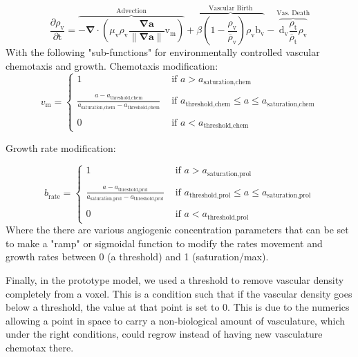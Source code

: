 \documentclass[10point]{article}
\newcommand{\beq}{\begin{equation}}
\newcommand{\eeq}{\end{equation}}
\renewcommand{\vec}[1]{\mathbf{#1}}
\begin{document}
\beq
     \frac{\partial \rho_{\textrm{v}}}{\partial {\textrm{t}}} = \overbrace{ - \vec{\nabla} \cdot \left( \mu_{\textrm{v}} \rho_{\textrm{v}} \frac{\vec{\nabla a}}{\parallel \vec{\nabla a} \parallel} \textrm{v}_{\textrm{m}} \right)}^{ \textrm{Advection} } + \overbrace{\beta (1 - \frac{\rho_{\textrm{v}}}{\overline{\rho}_{\textrm{v}}}) \rho_{\textrm{v}} \textrm{b}_\textrm{v}}^{ \textrm{Vascular Birth}} -\overbrace{\textrm{d}_{\textrm{v}} \frac{\rho_{\textrm{t}}}{\overline{\rho}_{\textrm{t}}} \rho_{\textrm{v}}}^{ \textrm {Vas. Death}}
\eeq
\newline
With the following "sub-functions" for environmentally controlled vascular chemotaxis and growth.
\newline
\newline
Chemotaxis modification:
\beq
v_\textrm{m} = 
\left\{
\begin{array}{lr} 
1 & \textrm{ if } a > a_\textrm{{saturation,chem}} \\ 
\\
\frac{ a - a_\textrm{{threshold,chem}}}{a_\textrm{{saturation,chem}} - a_\textrm{{threshold,chem}}} & \textrm{ if } a_\textrm{{threshold,chem}} \le a \le a_\textrm{{saturation,chem}} \\
\\
0 & \textrm{ if } a < a_\textrm{{threshold,chem}}
\end{array}
\right.
\eeq

Growth rate modification:

\beq
b_\textrm{{rate}} = 
\left\{
\begin{array}{lr}
1 & \textrm{ if } a > a_\textrm{{saturation,prol}} \\ 
\\
\frac{ a - a_\textrm{{threshold,prol}}}{a_\textrm{{saturation,prol}} - a_\textrm{{threshold,prol}}} & \textrm{ if } a_\textrm{{threshold,prol}} \le a \le a_\textrm{{saturation,prol}} \\
\\
0 & \textrm{ if } a < a_\textrm{{threshold,prol}}
\end{array}
\right.
\eeq
\newline
Where the there are various angiogenic concentration parameters that can be set to make a "ramp" or sigmoidal function to modify the rates movement and growth rates between 0 (a threshold) and 1 (saturation/max).  
\newline

Finally, in the prototype model, we used a threshold to remove vascular density completely from a voxel.  This is a condition such that if the vascular density goes below a threshold, the value at that point is set to 0.  This is due to the numerics allowing a point in space to carry a non-biological amount of vasculature, which under the right conditions, could regrow instead of having new vasculature chemotax there.

	
\end{document}
